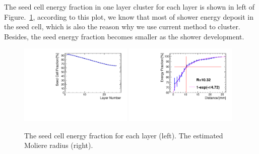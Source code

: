 

The seed cell energy fraction in one layer cluster for each layer is shown in left of Figure.~\ref{fig:energy_E_seed}, 
according to this plot, 
we know that most of shower energy deposit in the seed cell, 
which is also the reason why we use current method to cluster.
Besides, the seed energy fraction becomes smaller as the shower development.

\begin{figure}[!tbp]
\centering
\includegraphics[width=0.48\textwidth]{Figures/06_ECAL/energy_res_rela_angle/E_fraction_each_layers.pdf}
\includegraphics[width=0.48\textwidth]{Figures/06_ECAL/energy_res_rela_angle/E_moliere.pdf}
   \caption{The seed cell energy fraction for each layer (left).
   The estimated Moliere radius (right).} 
\label{fig:energy_E_seed}
\end{figure}


